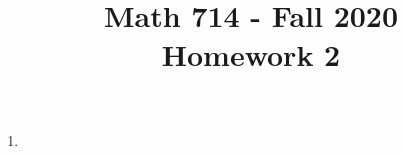 \documentclass{article}
\title{Math 714 - Fall 2020\\
        {\Large \textbf{Homework 2}}
    }
\date{}
\numberwithin{equation}{section}
\begin{document}
    \maketitle
    \section{}
    \begin{enumerate}[label=(\alph*)]
        \item 
    \end{enumerate}
\end{document}
